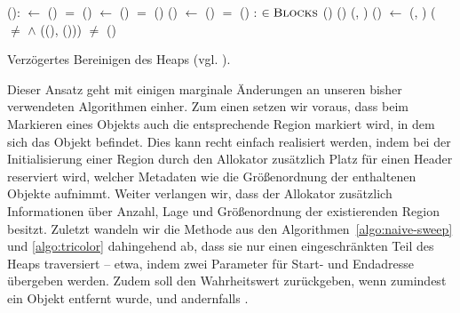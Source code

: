 
\begin{algorithm}[h]
\begin{algorithmic}[1]
	\State {}():
	\State \quad {} $\gets$ ()
	\State \quad \IF {} $=$ \Null
	\State \quad \quad {}()	
	\State \quad \quad {} $\gets$ ()	
	\State \quad \quad \IF {} $=$ \Null
	\State \quad \quad \quad {}()		
	\State \quad \quad \quad {}()	
	\State \quad \quad \quad {} $\gets$ ()	
	\State \quad \quad \quad \IF {} $=$ \Null
	\State \quad \quad \quad \quad {}()
	\State \quad \Return {}
	\Statex
	\State {}:
	\State \quad {}		
	\State \quad \FOREACH {} $\in \textsc{Blocks}$
	\State \quad \quad \IF {}()
	\State \quad \quad \quad {}()	
	\State \quad \quad \ELSE {}(, )
	\Statex
	\State {}()
	\State \quad \Do
	\State \quad \quad {} $\gets$ (, )
	\State \quad \quad \IF ( $\neq$ \Null $\wedge$ ((), ()))
	\State \quad \quad \quad \Return	{}
	\State \quad \WHILE {} $\neq$ 
	\State \quad {}()	
\end{algorithmic}
\caption[Verzögertes Bereinigen des Heaps]{Verzögertes Bereinigen des Heaps (vgl. \cite[S. 25]{handbook}).}
\label{algo:lazy-sweep}
\end{algorithm}

Dieser Ansatz geht mit einigen marginale Änderungen an unseren bisher verwendeten Algorithmen einher.
Zum einen setzen wir voraus, dass beim Markieren eines Objekts auch die entsprechende Region markiert wird, in dem sich das Objekt befindet.
Dies kann recht einfach realisiert werden, indem bei der Initialisierung einer Region durch den Allokator zusätzlich Platz für einen Header reserviert wird, welcher Metadaten wie die Größenordnung der enthaltenen Objekte aufnimmt.
Weiter verlangen wir, dass der Allokator zusätzlich Informationen über Anzahl, Lage und Größenordnung der existierenden Region besitzt.
Zuletzt wandeln wir die Methode  aus den Algorithmen~\ref{algo:naive-sweep} und \ref{algo:tricolor} dahingehend ab, dass sie nur einen eingeschränkten Teil des Heaps traversiert -- etwa, indem zwei Parameter für Start- und Endadresse übergeben werden.
Zudem soll  den Wahrheitswert  zurückgeben, wenn zumindest ein Objekt entfernt wurde, und andernfalls .

